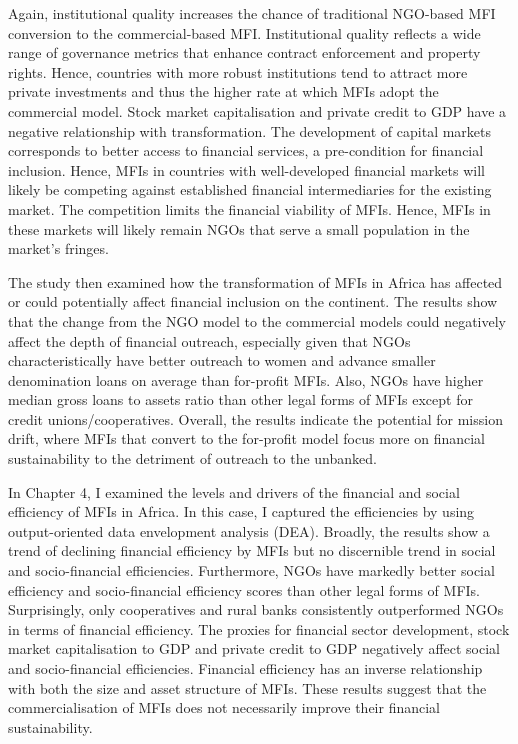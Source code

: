 \documentclass[a4paper, nobind]{templates/ociamthesis}
\begin{document}
Again, institutional quality increases the chance of traditional NGO-based MFI conversion to the commercial-based MFI. Institutional quality reflects a wide range of governance metrics that enhance contract enforcement and property rights. Hence, countries with more robust institutions tend to attract more private investments and thus the higher rate at which MFIs adopt the commercial model. Stock market capitalisation and private credit to GDP have a negative relationship with transformation. The development of capital markets corresponds to better access to financial services, a pre-condition for financial inclusion. Hence, MFIs in countries with well-developed financial markets will likely be competing against established financial intermediaries for the existing market. The competition limits the financial viability of MFIs. Hence, MFIs in these markets will likely remain NGOs that serve a small population in the market's fringes.

The study then examined how the transformation of MFIs in Africa has affected or could potentially affect financial inclusion on the continent. The results show that the change from the NGO model to the commercial models could negatively affect the depth of financial outreach, especially given that NGOs characteristically have better outreach to women and advance smaller denomination loans on average than for-profit MFIs. Also, NGOs have higher median gross loans to assets ratio than other legal forms of MFIs except for credit unions/cooperatives. Overall, the results indicate the potential for mission drift, where MFIs that convert to the for-profit model focus more on financial sustainability to the detriment of outreach to the unbanked.

In Chapter 4, I examined the levels and drivers of the financial and social efficiency of MFIs in Africa. In this case, I captured the efficiencies by using output-oriented data envelopment analysis (DEA). Broadly, the results show a trend of declining financial efficiency by MFIs but no discernible trend in social and socio-financial efficiencies. Furthermore, NGOs have markedly better social efficiency and socio-financial efficiency scores than other legal forms of MFIs. Surprisingly, only cooperatives and rural banks consistently outperformed NGOs in terms of financial efficiency. The proxies for financial sector development, stock market capitalisation to GDP and private credit to GDP negatively affect social and socio-financial efficiencies. Financial efficiency has an inverse relationship with both the size and asset structure of MFIs. These results suggest that the commercialisation of MFIs does not necessarily improve their financial sustainability.
\end{document}
